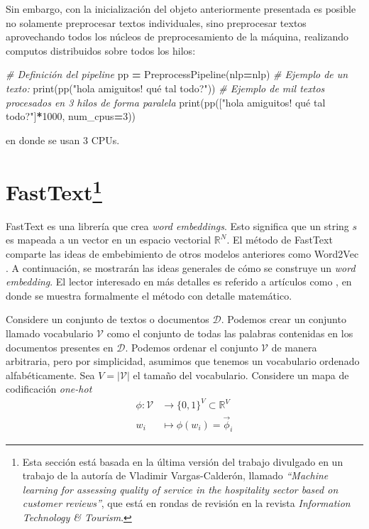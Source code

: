 \documentclass[
  spanish,
]{article}
\newenvironment{Shaded}{\begin{snugshade}}{\end{snugshade}}
\newcommand{\BuiltInTok}[1]{#1}
\newcommand{\CommentTok}[1]{\textcolor[rgb]{0.56,0.35,0.01}{\textit{#1}}}
\newcommand{\DecValTok}[1]{\textcolor[rgb]{0.00,0.00,0.81}{#1}}
\newcommand{\NormalTok}[1]{#1}
\newcommand{\OperatorTok}[1]{\textcolor[rgb]{0.81,0.36,0.00}{\textbf{#1}}}
\newcommand{\StringTok}[1]{\textcolor[rgb]{0.31,0.60,0.02}{#1}}
\begin{document}
Sin embargo, con la inicialización del objeto anteriormente presentada
es posible no solamente preprocesar textos individuales, sino
preprocesar textos aprovechando todos los núcleos de preprocesamiento de
la máquina, realizando computos distribuidos sobre todos los hilos:

\begin{Shaded}
\begin{Highlighting}[]
\CommentTok{\# Definición del pipeline}
\NormalTok{pp }\OperatorTok{=}\NormalTok{ PreprocessPipeline(nlp}\OperatorTok{=}\NormalTok{nlp)}
\CommentTok{\# Ejemplo de un texto:}
\BuiltInTok{print}\NormalTok{(pp(}\StringTok{"hola amiguitos! qué tal todo?"}\NormalTok{))}
\CommentTok{\# Ejemplo de mil textos procesados en 3 hilos de forma paralela}
\BuiltInTok{print}\NormalTok{(pp([}\StringTok{"hola amiguitos! qué tal todo?"}\NormalTok{]}\OperatorTok{*}\DecValTok{1000}\NormalTok{, num\_cpus}\OperatorTok{=}\DecValTok{3}\NormalTok{))}
\end{Highlighting}
\end{Shaded}

en donde se usan 3 CPUs.

\hypertarget{fasttextref_to_booking}{%
\section[FastText]{\texorpdfstring{FastText\footnote{Esta sección está
  basada en la última versión del trabajo divulgado en un trabajo de la
  autoría de Vladimir Vargas-Calderón, llamado \emph{``Machine learning
  for assessing quality of service in the hospitality sector based on
  customer reviews''}, que está en rondas de revisión en la revista
  \emph{Information Technology \& Tourism}.}}{FastText}}\label{fasttextref_to_booking}}

\label{sec:fasttext}

FastText es una librería que crea \emph{word embeddings}. Esto significa
que un string \(s\) es mapeada a un vector en un espacio vectorial
\(\mathbb{R}^N\). El método de FastText comparte las ideas de
embebimiento de otros modelos anteriores como Word2Vec
\citep{bojanowski2016enriching, joulin2016bag, mikolov2013distributed}.
A continuación, se mostrarán las ideas generales de cómo se construye un
\emph{word embedding}. El lector interesado en más detalles es referido
a artículos como
\citep{dyer2014notes, goldberg2014word2vec, vargas2019characterization},
en donde se muestra formalmente el método con detalle matemático.

Considere un conjunto de textos o documentos \(\mathcal{D}\). Podemos
crear un conjunto llamado vocabulario \(\mathcal{V}\) como el conjunto
de todas las palabras contenidas en los documentos presentes en
\(\mathcal{D}\). Podemos ordenar el conjunto \(\mathcal{V}\) de manera
arbitraria, pero por simplicidad, asumimos que tenemos un vocabulario
ordenado alfabéticamente. Sea \(V=|\mathcal{V}|\) el tamaño del
vocabulario. Considere un mapa de codificación \emph{one-hot}
\begin{align}
\phi:\mathcal{V}&\to\{0,1 \}^V\subset \mathbb{R}^V\\
w_i&\mapsto \phi(w_i) = \vec{\phi}_i
\end{align}
\end{document}
